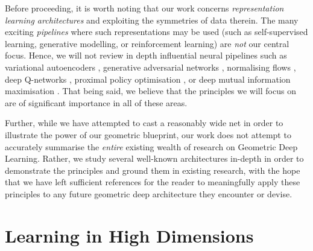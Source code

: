 Before proceeding, it is worth noting that our work concerns \emph{representation learning architectures}  and exploiting the symmetries of data therein. The many exciting \emph{pipelines} where such representations may be used (such as self-supervised learning, generative modelling, or reinforcement learning) are \emph{not} our central focus. Hence, we will not review in depth influential neural pipelines such as variational autoencoders \citep{kingma2013auto}, generative adversarial networks \citep{goodfellow2014generative}, normalising flows  \citep{rezende2015variational}, deep Q-networks \citep{mnih2015human}, proximal policy optimisation \citep{schulman2017proximal}, or deep mutual information maximisation \citep{hjelm2018learning}. That being said, we believe that the principles we will focus on are of significant importance in all of these areas.

Further, while we have attempted to cast a reasonably wide net in order to illustrate the power of our geometric blueprint, our work does not attempt to accurately summarise the \emph{entire} existing wealth of research on Geometric Deep Learning. Rather, we study several well-known architectures in-depth in order to demonstrate the principles and ground them in existing research, with the hope that we have left sufficient references for the reader to meaningfully apply these principles to any future geometric deep architecture they encounter or devise.

\section{Learning in High Dimensions}



    
